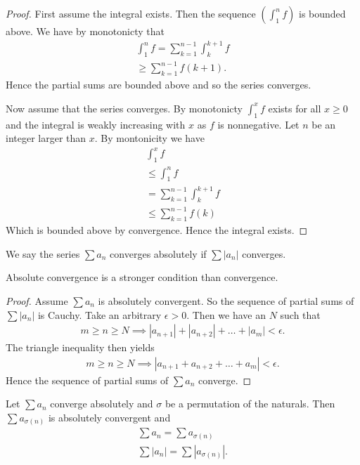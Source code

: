 \documentclass[]{article}
\begin{document}
\begin{proof}
		First assume the integral exists. Then the sequence $(\int_1^nf)$ is bounded above. We have by monotonicty that 
		\begin{align*}
				\int_1^nf = \sum_{k=1}^{n-1} \int_k^{k+1}f \\
				\geq \sum_{k=1}^{n-1} f(k+1).
		\end{align*}
		Hence the partial sums are bounded above and so the series converges.

		Now assume that the series converges. By monotonicty $\int_1^xf$ exists for all $x \geq 0$ and the integral is weakly increasing with $x$ as $f$ is nonnegative. Let $n$ be an integer larger than $x$. By montonicity we have
		\begin{align*}
				\int_1^x f \\
				\leq \int_1^nf \\
				= \sum_{k=1}^{n-1} \int_k^{k+1} f \\
				\leq \sum_{k=1}^{n-1} f(k)
		\end{align*}
		Which is bounded above by convergence. Hence the integral exists.
\end{proof}

\begin{defi} 
	We say the series $\sum a_n$ converges absolutely if $\sum |a_n|$ converges.
\end{defi}

\begin{thm}
	Absolute convergence is a stronger condition than convergence. 		
\end{thm}

\begin{proof}
	Assume $\sum a_n$ is absolutely convergent. So the sequence of partial sums of $\sum |a_n|$ is Cauchy. Take an arbitrary $\epsilon > 0$. Then we have an $N$ such that
	\begin{align*}
			m \geq n \geq N \implies |a_{n+1}| + |a_{n+2}| + \ldots +  |a_m| < \epsilon.
	\end{align*}
	The triangle inequality then yields
	\begin{align*}
			m \geq n \geq N \implies |a_{n+1} + a_{n+2} + \ldots +  a_m| < \epsilon.
	\end{align*}
	Hence the sequence of partial sums of $\sum a_n$ converge.
\end{proof}

\begin{thm}
		Let $\sum a_n$ converge absolutely and $\sigma$ be a permutation of the naturals. Then $\sum a_{\sigma(n)}$ is absolutely convergent and
		\begin{align*}
				\sum a_n = \sum a_{\sigma(n)} \\
				\sum |a_n| = \sum |a_{\sigma(n)}|.
		\end{align*}
\end{thm}
\end{document}
